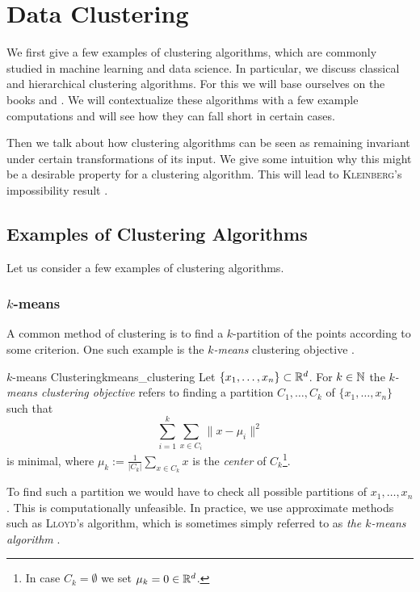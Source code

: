\chapter{Data Clustering}
\label{chapter__dataclustering}

We first give a few examples of clustering algorithms, which are commonly studied in machine learning and data science. In particular, we discuss classical and hierarchical clustering algorithms. For this we will base ourselves on the books \cite{Everitt2011} and \cite{Scitovski2021}.
We will contextualize these algorithms with a few example computations and will see how they can fall short in certain cases.

Then we talk about how clustering algorithms can be seen as remaining invariant under certain transformations of its input. We give some intuition why this might be a desirable property for a clustering algorithm. This will lead to \textsc{Kleinberg}'s impossibility result \cite{Kleinberg2002}.

\section{Examples of Clustering Algorithms}
Let us consider a few examples of clustering algorithms.

\subsection{$k$-means}
A common method of clustering is to find a $k$-partition of the points according to some criterion.
One such example is the \emph{$k$-means} clustering objective \cite[Sec.~3.1]{Scitovski2021}.

\begin{definition}{$k$-means Clustering}{kmeans_clustering}
Let $\{x_1, \dots, x_n\} \subset \mathbb R^d$. For $k \in \mathbb N$ the \emph{$k$-means clustering objective} refers to finding a partition $C_1, \dots, C_k$ of $\{x_1, \dots, x_n\}$ such that
\begin{equation*}
\label{eq:kmean_optimization}
    \sum_{i = 1}^k \sum_{x \in C_i} \|x - \mu_i\|^2
\end{equation*}
is minimal, where $\mu_k := \frac{1}{|C_k|}\sum_{x \in C_k} x$ is the \emph{center} of $C_k$\footnote{In case $C_k = \emptyset$ we set $\mu_k = 0 \in \mathbb R^d$.}.
\end{definition}
To find such a partition we would have to check all possible partitions of $x_1, \dots, x_n$. This is computationally unfeasible. In practice, we use approximate methods such as \textsc{Lloyd}'s algorithm, which is sometimes simply referred to as \emph{the $k$-means algorithm} \cite[Sec.~3.1.2]{Scitovski2021}.

